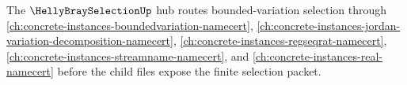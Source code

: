 The $\HellyBraySelectionUp$ hub routes bounded-variation selection through \autoref{ch:concrete-instances-boundedvariation-namecert}, \autoref{ch:concrete-instances-jordan-variation-decomposition-namecert}, \autoref{ch:concrete-instances-regseqrat-namecert}, \autoref{ch:concrete-instances-streamname-namecert}, and \autoref{ch:concrete-instances-real-namecert} before the child files expose the finite selection packet.



